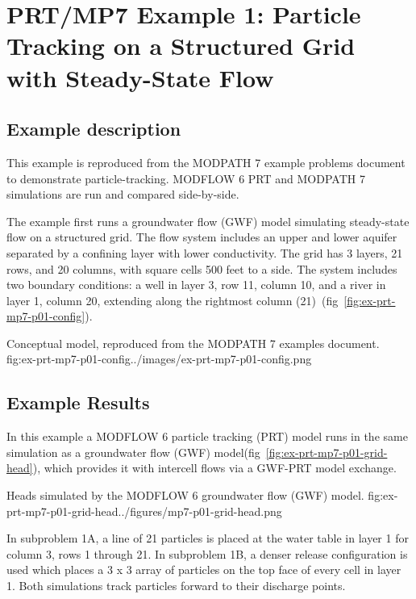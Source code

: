 \section{PRT/MP7 Example 1: Particle Tracking on a Structured Grid with Steady-State Flow}

\subsection{Example description}

This example is reproduced from the MODPATH 7 example problems document \citep{modpath7examples} to demonstrate particle-tracking. MODFLOW 6 PRT and MODPATH 7 simulations are run and compared side-by-side.

The example first runs a groundwater flow (GWF) model simulating steady-state flow on a structured grid. The flow system includes an upper and lower aquifer separated by a confining layer with lower conductivity. The grid has 3 layers, 21 rows, and 20 columns, with square cells 500 feet to a side. The system includes two boundary conditions: a well in layer 3, row 11, column 10, and a river in layer 1, column 20, extending along the rightmost column (21)~(fig~\ref{fig:ex-prt-mp7-p01-config}). 

\begin{StandardFigure}{
    Conceptual model, reproduced from the MODPATH 7 examples document.
    }{fig:ex-prt-mp7-p01-config}{../images/ex-prt-mp7-p01-config.png}
\end{StandardFigure}

\subsection{Example Results}

In this example a MODFLOW 6 particle tracking (PRT) model runs in the same simulation as a groundwater flow (GWF) model(fig~\ref{fig:ex-prt-mp7-p01-grid-head}), which provides it with intercell flows via a GWF-PRT model exchange.

\begin{StandardFigure}{
    Heads simulated by the MODFLOW 6 groundwater flow (GWF) model.
    }{fig:ex-prt-mp7-p01-grid-head}{../figures/mp7-p01-grid-head.png}
\end{StandardFigure}

In subproblem 1A, a line of 21 particles is placed at the water table in layer 1 for column 3, rows 1 through 21. In subproblem 1B, a denser release configuration is used which places a 3 x 3 array of particles on the top face of every cell in layer 1. Both simulations track particles forward to their discharge points.

